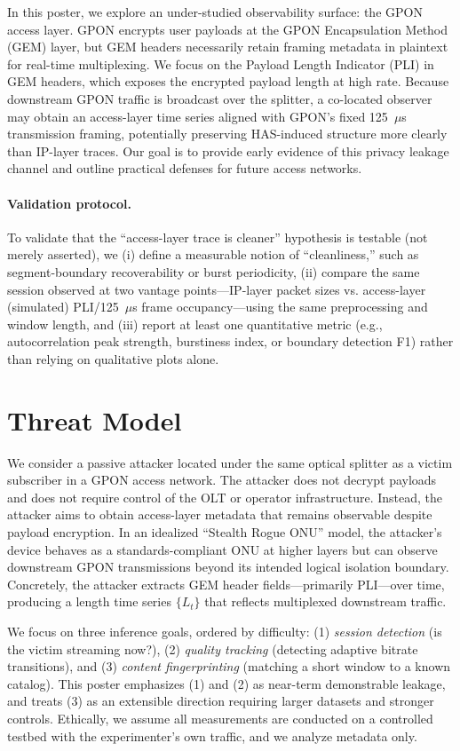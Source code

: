 \documentclass[conference]{IEEEtran}
\begin{document}
In this poster, we explore an under-studied observability surface: the GPON access layer. GPON encrypts user payloads at the GPON Encapsulation Method (GEM) layer, but GEM headers necessarily retain framing metadata in plaintext for real-time multiplexing. We focus on the Payload Length Indicator (PLI) in GEM headers, which exposes the encrypted payload length at high rate. Because downstream GPON traffic is broadcast over the splitter, a co-located observer may obtain an access-layer time series aligned with GPON's fixed 125~$\mu$s transmission framing, potentially preserving HAS-induced structure more clearly than IP-layer traces. Our goal is to provide early evidence of this privacy leakage channel and outline practical defenses for future access networks.

\paragraph{Validation protocol.} To validate that the ``access-layer trace is cleaner'' hypothesis is testable (not merely asserted), we (i) define a measurable notion of ``cleanliness,'' such as segment-boundary recoverability or burst periodicity, (ii) compare the same session observed at two vantage points---IP-layer packet sizes vs. access-layer (simulated) PLI/125~$\mu$s frame occupancy---using the same preprocessing and window length, and (iii) report at least one quantitative metric (e.g., autocorrelation peak strength, burstiness index, or boundary detection F1) rather than relying on qualitative plots alone.

\section{Threat Model}
We consider a passive attacker located under the same optical splitter as a victim subscriber in a GPON access network. The attacker does not decrypt payloads and does not require control of the OLT or operator infrastructure. Instead, the attacker aims to obtain access-layer metadata that remains observable despite payload encryption. In an idealized ``Stealth Rogue ONU'' model, the attacker's device behaves as a standards-compliant ONU at higher layers but can observe downstream GPON transmissions beyond its intended logical isolation boundary. Concretely, the attacker extracts GEM header fields---primarily PLI---over time, producing a length time series $\{L_t\}$ that reflects multiplexed downstream traffic.

We focus on three inference goals, ordered by difficulty: (1) \emph{session detection} (is the victim streaming now?), (2) \emph{quality tracking} (detecting adaptive bitrate transitions), and (3) \emph{content fingerprinting} (matching a short window to a known catalog). This poster emphasizes (1) and (2) as near-term demonstrable leakage, and treats (3) as an extensible direction requiring larger datasets and stronger controls. Ethically, we assume all measurements are conducted on a controlled testbed with the experimenter's own traffic, and we analyze metadata only.
\end{document}
